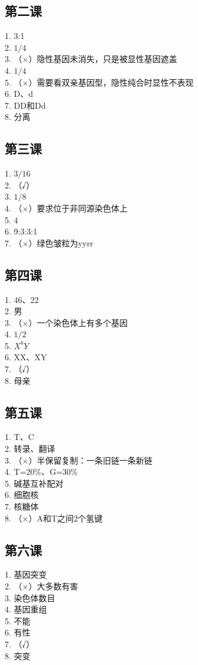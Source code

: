 \documentclass[a4paper,12pt]{ctexart}
\begin{document}
\subsection*{第二课}
1. 3:1\\
2. $1/4$\\
3. （×）隐性基因未消失，只是被显性基因遮盖\\
4. $1/4$\\
5. （×）需要看双亲基因型，隐性纯合时显性不表现\\
6. D、d\\
7. DD和Dd\\
8. 分离

\subsection*{第三课}
1. $3/16$\\
2. （√）\\
3. $1/8$\\
4. （×）要求位于非同源染色体上\\
5. 4\\
6. 9:3:3:1\\
7. （×）绿色皱粒为yyrr

\subsection*{第四课}
1. 46、22\\
2. 男\\
3. （×）一个染色体上有多个基因\\
4. $1/2$\\
5. $X^bY$\\
6. XX、XY\\
7. （√）\\
8. 母亲

\subsection*{第五课}
1. T、C\\
2. 转录、翻译\\
3. （×）半保留复制：一条旧链一条新链\\
4. T=20\%、G=30\%\\
5. 碱基互补配对\\
6. 细胞核\\
7. 核糖体\\
8. （×）A和T之间2个氢键

\subsection*{第六课}
1. 基因突变\\
2. （×）大多数有害\\
3. 染色体数目\\
4. 基因重组\\
5. 不能\\
6. 有性\\
7. （√）\\
8. 突变
\end{document}
